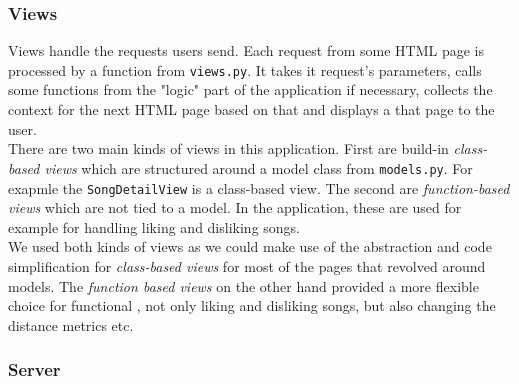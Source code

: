 \subsubsection{Views}
Views handle the requests users send. Each request from some HTML page is processed by a function from \texttt{views.py}. It takes it request's parameters, calls some functions from the "logic" part of the application if necessary, collects the context for the next HTML page based on that and displays a that page to the user. \\
There are two main kinds of views in this application. First are build-in \textit{class-based views} which are structured around a model class from \texttt{models.py}. For exapmle the \texttt{SongDetailView} is a class-based view. The second are \textit{function-based views} which are not tied to a model. In the application, these are used for example for handling liking and disliking songs. \\
We used both kinds of views as we could make use of the abstraction and code simplification for \textit{class-based views} for most of the pages that revolved around models. The \textit{function based views} on the other hand provided a more flexible choice for functional , not only liking and disliking songs, but also changing the distance metrics etc. \\

\subsubsection{Server}\label{sssec:server}

